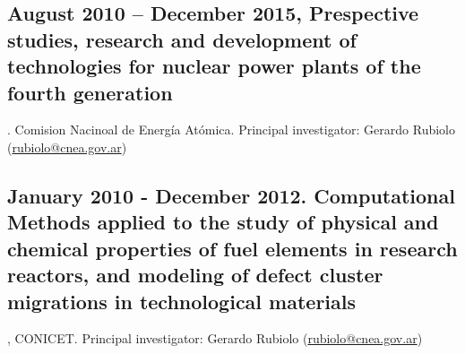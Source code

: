 \subsection{August 2010 – December 2015, Prespective studies, research and
development of technologies for nuclear power plants of the fourth generation}.
Comision Nacinoal de Energía Atómica. Principal investigator: Gerardo Rubiolo (\href{mailto:rubiolo@cnea.gov.ar}{rubiolo@cnea.gov.ar})

 \subsection{January 2010 - December 2012. Computational Methods applied to the
 study of physical and chemical properties of fuel elements in research
 reactors, and modeling of defect cluster migrations in technological
 materials}, CONICET. Principal investigator: Gerardo Rubiolo (\href{mailto:rubiolo@cnea.gov.ar}{rubiolo@cnea.gov.ar})

